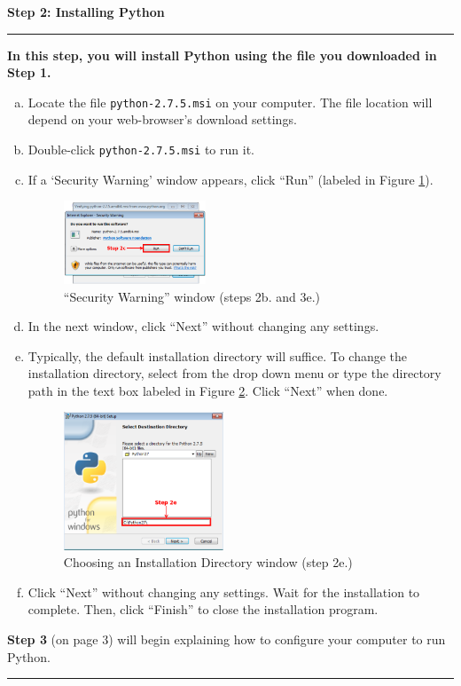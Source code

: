 \documentclass[11pt,english]{article}
\newcommand{\myhrule}{\vspace{0.3cm}\hrule\vspace{0.3cm}}
\begin{document}
\newpage
{\Large {\bf Step 2: Installing Python}}
\myhrule
{\bf In this step, you will install Python using the file you downloaded in
Step 1.}
\begin{enumerate}[a.]
\item Locate the file \texttt{python-2.7.5.msi} on your computer. The file
location will depend on your web-browser's download settings.
\item Double-click \texttt{python-2.7.5.msi} to run it.
\item If a `Security Warning' window appears, click ``Run'' (labeled in Figure
\ref{fig:dia2}).
\begin{figure}[h]
\begin{center}
\includegraphics[width=0.4\textwidth]{dia2}
\end{center}
\vspace{-0.5cm}
\caption{``Security Warning'' window (steps 2b. and 3e.)}
\label{fig:dia2}
\end{figure}
\item In the next window, click ``Next'' without changing any settings.
\item Typically, the default installation directory will suffice. To change the
installation directory, select from the drop down menu or type the directory
path in the text box labeled in Figure \ref{fig:dia3}. Click ``Next'' when
done.
\begin{figure}[h]
\begin{center}
\includegraphics[width=0.45\textwidth]{dia3}
\end{center}
\vspace{-0.5cm}
\caption{Choosing an Installation Directory window (step 2e.)}
\label{fig:dia3}
\end{figure}
\item Click ``Next'' without changing any settings. Wait for the installation
to complete. Then, click ``Finish'' to close the installation program.
\end{enumerate}
\vfill
{\bf Step 3} (on page 3) will begin explaining how to configure your computer
to run Python.
\myhrule
\end{document}

